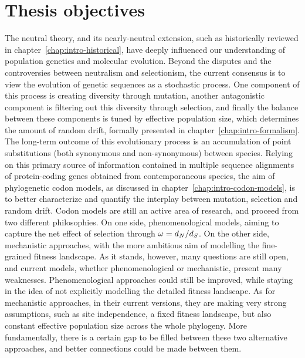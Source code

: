 \chapter{Thesis objectives}
{\hypersetup{linkcolor=GREYDARK}\minitoc}
\label{chap:goals}

The neutral theory, and its nearly-neutral extension, such as historically reviewed in chapter~\ref{chap:intro-historical}, have deeply influenced our understanding of population genetics and molecular evolution.
Beyond the disputes and the controversies between neutralism and selectionism, the current consensus is to view the evolution of genetic sequences as a stochastic process.
One component of this process is creating diversity through mutation, another antagonistic component is filtering out this diversity through selection, and finally the balance between these components is tuned by effective population size, which determines the amount of random drift, formally presented in chapter~\ref{chap:intro-formalism}.
The long-term outcome of this evolutionary process is an accumulation of point substitutions (both synonymous and non-synonymous) between species.
Relying on this primary source of information contained in multiple sequence alignments of protein-coding genes obtained from contemporaneous species, the aim of phylogenetic codon models, as discussed in chapter~\ref{chap:intro-codon-models}, is to better characterize and quantify the interplay between mutation, selection and random drift.
Codon models are still an active area of research, and proceed from two different philosophies.
On one side, phenomenological models, aiming to capture the net effect of selection through $\omega = d_N / d_S$.
On the other side, mechanistic approaches, with the more ambitious aim of modelling the fine-grained fitness landscape.
As it stands, however, many questions are still open, and current models, whether phenomenological or mechanistic, present many weaknesses.
Phenomenological approaches could still be improved, while staying in the idea of not explicitly modelling the detailed fitness landscape.
As for mechanistic approaches, in their current versions, they are making very strong assumptions, such as site independence, a fixed fitness landscape, but also constant effective population size across the whole phylogeny.
More fundamentally, there is a certain gap to be filled between these two alternative approaches, and better connections could be made between them.

